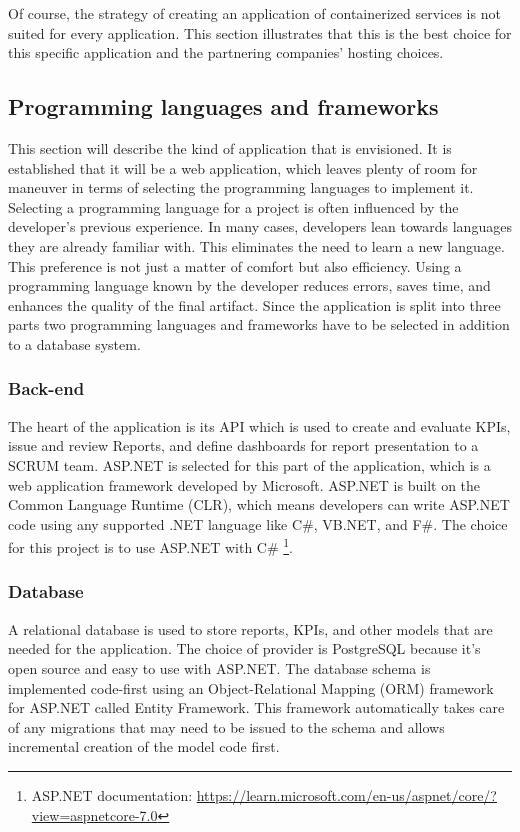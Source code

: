 Of course, the strategy of creating an application of containerized services is not suited for every application. 
This section illustrates that this is the best choice for this specific application and the partnering companies' hosting choices.

\subsection{Programming languages and frameworks}

This section will describe the kind of application that is envisioned.
It is established that it will be a web application, which leaves plenty of room for maneuver in terms of selecting the programming languages to implement it.
Selecting a programming language for a project is often influenced by the developer's previous experience. 
In many cases, developers lean towards languages they are already familiar with. 
This eliminates the need to learn a new language. 
This preference is not just a matter of comfort but also efficiency. 
Using a programming language known by the developer reduces errors, saves time,
and enhances the quality of the final artifact. 
Since the application is split into three parts two programming languages and frameworks have to be selected in addition to a database system.


\subsubsection*{Back-end}

The heart of the application is its API which is used to create and evaluate KPIs, 
issue and review Reports, and define dashboards for report presentation to a SCRUM team. 
ASP.NET is selected for this part of the application, 
which is a web application framework developed by Microsoft. 
ASP.NET is built on the Common Language Runtime (CLR), 
which means developers can write ASP.NET code using any supported .NET language like C\#, 
VB.NET, and F\#. The choice for this project is to use ASP.NET with C\# \footnote{ASP.NET documentation: \url{https://learn.microsoft.com/en-us/aspnet/core/?view=aspnetcore-7.0}}.

\subsubsection*{Database}

A relational database is used to store reports, 
KPIs, and other models that are needed for the application. 
The choice of provider is PostgreSQL because it's open source and easy to use with ASP.NET. 
The database schema is implemented code-first using an Object-Relational Mapping (ORM) framework for ASP.NET called Entity Framework. 
This framework automatically takes care of any migrations that may need to be issued to the schema and allows incremental creation of the model code first.


